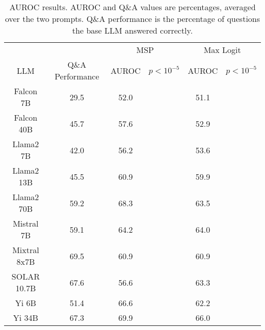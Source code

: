 \begin{table*}
\centering
\begin{tabular}{c|c|c|c|c|c}
& & \multicolumn{2}{c|}{MSP} & \multicolumn{2}{c}{Max Logit} \\ 
LLM & Q\&A Performance & AUROC & $p < 10^{-5}$ & AUROC & $p < 10^{-5}$\\ \hline
Falcon 7B & 29.5 & 52.0 &  & 51.1 & \\
Falcon 40B & 45.7 & 57.6 &  & 52.9 & \\
Llama2 7B & 42.0 & 56.2 &  & 53.6 & \\
Llama2 13B & 45.5 & 60.9 &  & 59.9 & \\
Llama2 70B & 59.2 & 68.3 &  & 63.5 & \\
Mistral 7B & 59.1 & 64.2 &  & 64.0 & \\
Mixtral 8x7B & 69.5 & 60.9 &  & 60.9 & \\
SOLAR 10.7B & 67.6 & 56.6 &  & 63.3 & \\
Yi 6B & 51.4 & 66.6 &  & 62.2 & \\
Yi 34B & 67.3 & 69.9 &  & 66.0 & \\
\hline
\end{tabular}
\caption{AUROC results. AUROC and Q\&A values are percentages, averaged over the two prompts. Q\&A performance is the percentage of questions the base LLM answered correctly.}
\label{tab:auroc}
\end{table*}
